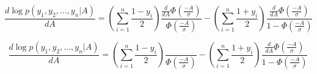 \documentclass{amsart}
\begin{document}
\begin{equation}
\frac{d\log p(y_1, y_2, ..., y_n | A)}{dA} = \left( \sum_{i=1}^{n}\frac{1-y_i}{2} \right)  \frac{\frac{d}{dA} \Phi(\frac{-A}{\sigma})}{\Phi(\frac{-A}{\sigma})} - \left( \sum_{i=1}^{n}\frac{1+y_i}{2} \right)  \frac{\frac{d}{dA} \Phi(\frac{-A}{\sigma})}{1-\Phi(\frac{-A}{\sigma})}
\end{equation}

\begin{equation}
\frac{d\log p(y_1, y_2, ..., y_n | A)}{dA} = \left( \sum_{i=1}^{n}\frac{1-y_i}{2} \right)  \frac{}{\Phi(\frac{-A}{\sigma})} - \left( \sum_{i=1}^{n}\frac{1+y_i}{2} \right)  \frac{\frac{d}{dA} \Phi(\frac{-A}{\sigma})}{1-\Phi(\frac{-A}{\sigma})}
\end{equation}
\end{document}
